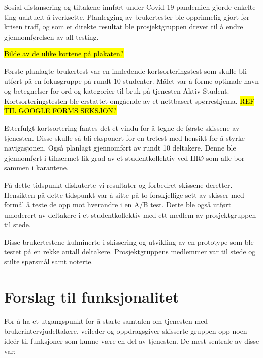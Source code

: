 Sosial distansering og tiltakene innført under Covid-19 pandemien gjorde enkelte ting uaktuelt å iverksette. Planlegging av brukertester ble opprinnelig gjort før krisen traff, og som et direkte resultat ble prosjektgruppen drevet til å endre gjennomførelsen av all testing.

\hl{Bilde av de ulike kortene på plakaten?}

Første planlagte brukertest var en innledende kortsorteringstest som skulle bli utført på en fokusgruppe på rundt 10 studenter. Målet var å forme optimale navn og betegnelser for ord og kategorier til bruk på tjenesten Aktiv Student. Kortsorteringstesten ble erstattet omgående av et nettbasert spørreskjema. \hl{REF TIL GOOGLE FORMS SEKSJON?}

Etterfulgt kortsortering fantes det et vindu for å tegne de første skissene av tjenesten. Disse skulle så bli eksponert for en tretest med hensikt for å styrke navigasjonen. Også planlagt gjennomført av rundt 10 deltakere. Denne ble gjennomført i tilnærmet lik grad av et studentkollektiv ved HIØ som alle bor sammen i karantene.

På dette tidspunkt diskuterte vi resultater og forbedret skissene deretter. Hensikten på dette tidspunkt var å sitte på to forskjellige sett av skisser med formål å teste de opp mot hverandre i en A/B test. Dette ble også utført umoderert av deltakere i et studentkollektiv med ett medlem av prosjektgruppen til stede.

Disse brukertestene kulminerte i skissering og utvikling av en prototype
som ble testet på en rekke antall deltakere. Prosjektgruppens medlemmer var til stede og stilte spørsmål samt noterte.





\section{Forslag til funksjonalitet}
\label{section:funkForslag}
For å ha et utgangspunkt for å starte samtalen om tjenesten med brukerintervjudeltakere, veileder og oppdragsgiver skisserte gruppen opp noen ideér til funksjoner som kunne være en del av tjenesten. De mest sentrale av disse var:%

